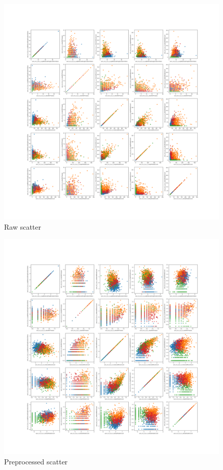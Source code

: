 \documentclass{article}
\begin{document}
\begin{figure}[H]
    \centering
    \includegraphics[width=1\columnwidth]{Crystal/actions_logtransform_zNonepca2k4/Raw Scatter.png}
    \caption{Raw scatter}
    \label{fig:Crystalactionsrawscatter}
\end{figure}
\begin{figure}[H]
    \centering
    \includegraphics[width=1\columnwidth]{Crystal/actions_logtransform_zNonepca2k4/Preprocessed Scatter.png}
    \caption{Preprocessed scatter}
    \label{fig:Crystalactionspreprocessedscatter}
\end{figure}
\end{document}
